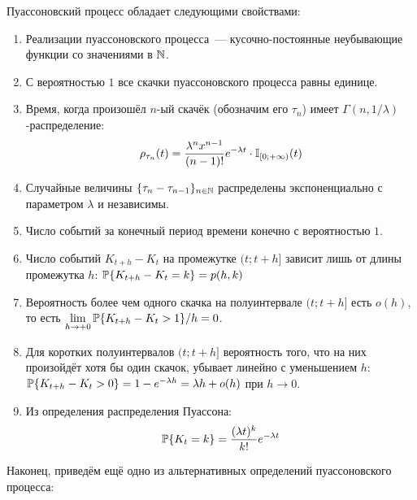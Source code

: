 \begin{statement}
    \label{statement:special:Poisson_process_properties}
    Пуассоновский процесс обладает следующими свойствами:
    \begin{enumerate}
        \item
            Реализации пуассоновского процесса~--- кусочно-постоянные неубывающие функции со значениями в $ \mathbb{N} $.
        \item
            С вероятностью $ 1 $ все скачки пуассоновского процесса равны единице.
        \item
            Время, когда произошёл $ n $-ый скачёк (обозначим его $ \tau_n $) имеет $ \Gamma(n, 1/\lambda) $-распределение:
            \[
                \rho_{\tau_n}(t) = \frac{\lambda^n x^{n-1}}{(n-1)!} e^{-\lambda t} \cdot \mathbb{I}_{[0;+\infty)}(t)
            \]
        \item
            Случайные величины $ \{\tau_{n} - \tau_{n-1}\}_{n \in \mathbb{N}} $ распределены экспоненциально с параметром $ \lambda $ и независимы.
        \item
            Число событий за конечный период времени конечно с вероятностью $ 1 $.
        \item
            Число событий $ K_{t+h} - K_t $ на промежутке $ (t; t+h] $ зависит лишь от длины промежутка $ h $:
            $ \mathbb{P} \{ K_{t + h} - K_t = k \} = p(h, k) $
        \item
            Вероятность более чем одного скачка на полуинтервале $ (t; t + h] $ есть $ o(h) $,
            то есть $ \displaystyle \lim_{h \to +0} \mathbb{P} \{ K_{t+h} - K_t > 1 \} / h = 0 $.
        \item
            Для коротких полуинтервалов $ (t; t+h] $ вероятность того, что на них произойдёт хотя бы один скачок,
            убывает линейно с уменьшением $ h $: $ \mathbb{P} \{ K_{t+h} - K_t > 0 \} = 1 - e^{-\lambda h} = \lambda h + o(h) $ при $ h \to 0 $.
        \item
            Из определения распределения Пуассона:
            \[
                \mathbb{P}\{K_t = k\} = \frac{(\lambda t)^k}{k!} e^{-\lambda t}
            \]
    \end{enumerate}
\end{statement}

Наконец, приведём ещё одно из альтернативных определений пуассоновского процесса:

